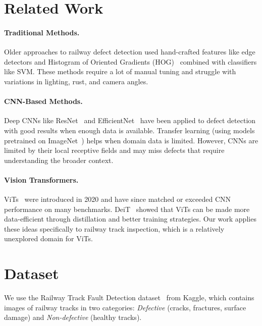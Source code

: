 \documentclass[10pt,twocolumn,letterpaper]{article}
\begin{document}
\section{Related Work}

\paragraph{Traditional Methods.}
Older approaches to railway defect detection used hand-crafted features like edge detectors and Histogram of Oriented Gradients (HOG)~\cite{Dalal2005} combined with classifiers like SVM. These methods require a lot of manual tuning and struggle with variations in lighting, rust, and camera angles.

\paragraph{CNN-Based Methods.}
Deep CNNs like ResNet~\cite{He2016} and EfficientNet~\cite{Tan2019} have been applied to defect detection with good results when enough data is available. Transfer learning (using models pretrained on ImageNet~\cite{Deng2009}) helps when domain data is limited. However, CNNs are limited by their local receptive fields and may miss defects that require understanding the broader context.

\paragraph{Vision Transformers.}
ViTs~\cite{Dosovitskiy2021} were introduced in 2020 and have since matched or exceeded CNN performance on many benchmarks. DeiT~\cite{Touvron2021} showed that ViTs can be made more data-efficient through distillation and better training strategies. Our work applies these ideas specifically to railway track inspection, which is a relatively unexplored domain for ViTs.

\section{Dataset}

We use the Railway Track Fault Detection dataset~\cite{RailwayDataset} from Kaggle, which contains images of railway tracks in two categories: \textit{Defective} (cracks, fractures, surface damage) and \textit{Non-defective} (healthy tracks).
\end{document}
